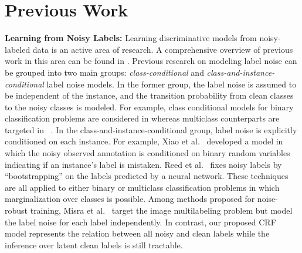 \documentclass{article}
\begin{document}
\section{Previous Work} 
\textbf{Learning from Noisy Labels:}
Learning discriminative models from noisy-labeled data is an active area of research. A comprehensive overview of previous work in this area can be found in \cite{FrenayV14}.
 Previous research on modeling label noise can be grouped into two main groups: \textit{class-conditional} and \textit{class-and-instance-conditional} label noise models. 
In the former group, the label noise is assumed to be independent of the instance, and the transition probability from clean classes to the noisy classes is modeled. 
For example, class conditional models for binary classification problems are considered in \cite{natarajan2013learning, mnih2012learning} whereas
multiclass counterparts are targeted in ~\cite{patrini2016,sukhbaatar2014}. In the class-and-instance-conditional group, label noise is explicitly conditioned on each instance. 
For example, Xiao et al.~\cite{Xiao2015} developed a model in which the noisy observed annotation is conditioned on binary random variables indicating if an instance's label 
is mistaken. Reed et al.~\cite{reed2014} fixes noisy labels by ``bootstrapping'' on the labels predicted by a neural network. 
These techniques are all applied to either binary or multiclass classification problems in which marginalization over classes is possible.
Among methods proposed for noise-robust training, Misra et al.~\cite{Misra2016} target the image multilabeling problem but model the label noise for 
each label independently. In contrast, our proposed CRF model represents the relation between all noisy and clean labels while the inference over latent clean labels is still tractable.


\iffalse
For example, Natarajan et al.~\cite{natarajan2013learning} proposed an unbiased estimator of 
loss functions for binary classification. Similarly, Mnih and Hinton \cite{mnih2012learning} explored class conditional noise model for binary
classification using CNNs. Patrini et al.~\cite{patrini2016} and Sukhbaatar et al.~\cite{sukhbaatar2014} proposed approaches to estimate class conditional 
transition probabilities in multiclass problems. In the class-and-instance-conditional group, label noise is explicitly conditioned on each instance. 
For example, Xiao et al.~\cite{Xiao2015} developed a probabilistic model in which the noisy observed annotation is conditioned on whether an instance's label 
is mistaken in addition to its clean latent label. Reed et al.~\cite{reed2014} fixes noisy labels by bootstrapping on the labels predicted by a neural network. 
These techniques are all applied to either binary or multiclass classification problems in which marginalization over classes is possible.
Among methods proposed for noise-robust training, Misra et al.~\cite{Misra2016} targets the image multilabeling problem but models the label noise for 
each label independently ignoring the correlations between all the clean labels and noisy observed annotation. 
\fi
\end{document}
